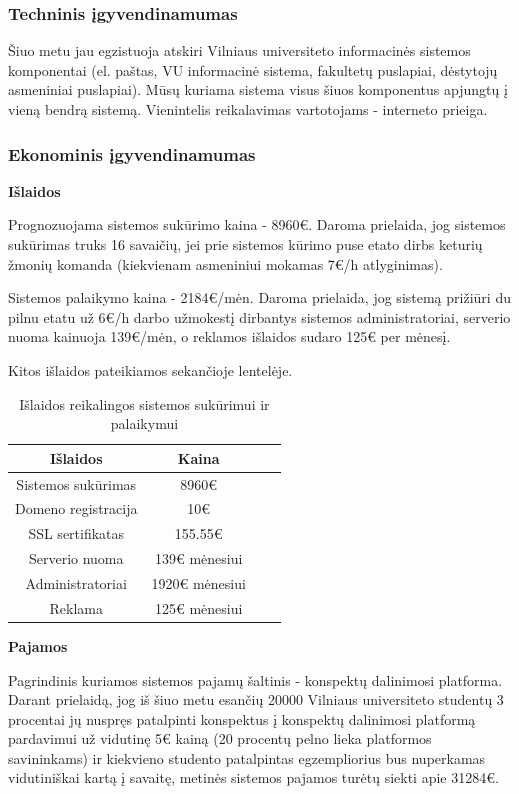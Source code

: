 \documentclass{VUMIFPSkursinis}
\begin{document}
\subsubsection{Techninis įgyvendinamumas}
Šiuo metu jau egzistuoja atskiri Vilniaus universiteto informacinės sistemos komponentai (el. paštas, VU informacinė sistema, fakultetų puslapiai, dėstytojų asmeniniai puslapiai). Mūsų kuriama sistema visus šiuos komponentus apjungtų į vieną bendrą sistemą. Vienintelis reikalavimas vartotojams - interneto prieiga.

\subsubsection{Ekonominis įgyvendinamumas}
\textbf{Išlaidos}

Prognozuojama sistemos sukūrimo kaina - 8960€. Daroma prielaida, jog sistemos sukūrimas truks 16 savaičių, jei prie sistemos kūrimo puse etato dirbs keturių žmonių komanda (kiekvienam asmeniniui mokamas 7€/h atlyginimas).

Sistemos palaikymo kaina - 2184€/mėn. Daroma prielaida, jog sistemą prižiūri du pilnu etatu už 6€/h darbo užmokestį dirbantys sistemos administratoriai, serverio nuoma kainuoja 139€/mėn, o reklamos išlaidos sudaro 125€ per mėnesį.

Kitos išlaidos pateikiamos sekančioje lentelėje.

\begin{table}[H]
	\centering
	\caption{Išlaidos reikalingos sistemos sukūrimui ir palaikymui}
    {\begin{tabular}{|c|c|c|c|} \hline
			Išlaidos & Kaina  \\
			\hline
			Sistemos sukūrimas & 8960€\\
			\hline
			Domeno registracija & 10€  \\
			\hline
			SSL sertifikatas & 155.55€ \\
			\hline
			Serverio nuoma & 139€ mėnesiui \\
			\hline
			Administratoriai & 1920€ mėnesiui \\
			\hline
			Reklama & 125€ mėnesiui \\
			\hline
	\end{tabular}}
\end{table}

\textbf{Pajamos}

Pagrindinis kuriamos sistemos pajamų šaltinis - konspektų dalinimosi platforma. Darant prielaidą, jog iš šiuo metu esančių 20000 Vilniaus universiteto studentų 3 procentai jų nuspręs patalpinti konspektus į konspektų dalinimosi platformą pardavimui už vidutinę 5€ kainą (20 procentų pelno lieka platformos savininkams) ir kiekvieno studento patalpintas egzempliorius bus nuperkamas vidutiniškai kartą į savaitę, metinės sistemos pajamos turėtų siekti apie 31284€.
\end{document}

